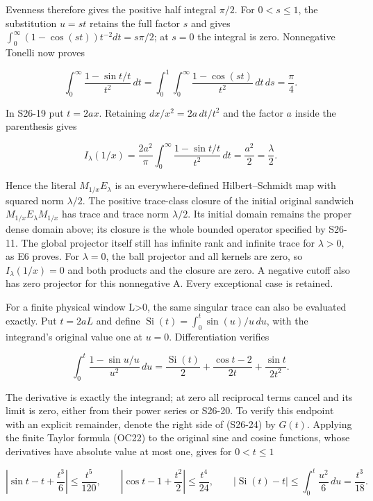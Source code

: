\documentclass[
  11pt,
]{article}
\begin{document}
Evenness therefore gives the positive half integral \(\pi/2\). For
\(0<s\le1\), the substitution \(u=st\) retains the full factor \(s\) and
gives \(\int_0^\infty(1-\cos(st))t^{-2}dt=s\pi/2\); at \(s=0\) the
integral is zero. Nonnegative Tonelli now proves

\[
\int_0^\infty\frac{1-\sin t/t}{t^2}\,dt
=\int_0^1\int_0^\infty\frac{1-\cos(st)}{t^2}\,dt\,ds
=\frac\pi4.
\tag{S26-22}
\]

In S26-19 put \(t=2ax\). Retaining \(dx/x^2=2a\,dt/t^2\) and the factor
\(a\) inside the parenthesis gives

\[
I_\lambda(1/x)
=\frac{2a^2}{\pi}\int_0^\infty
                   \frac{1-\sin t/t}{t^2}\,dt
=\frac{a^2}2=\frac\lambda2.
\tag{S26-23}
\]

Hence the literal \(M_{1/x}E_\lambda\) is an everywhere-defined
Hilbert--Schmidt map with squared norm \(\lambda/2\). The positive
trace-class closure of the initial original sandwich
\(M_{1/x}E_\lambda M_{1/x}\) has trace and trace norm \(\lambda/2\). Its
initial domain remains the proper dense domain above; its closure is the
whole bounded operator specified by S26-11. The global projector itself
still has infinite rank and infinite trace for \(\lambda>0\), as E6
proves. For \(\lambda=0\), the ball projector and all kernels are zero,
so \(I_\lambda(1/x)=0\) and both products and the closure are zero. A
negative cutoff also has zero projector for this nonnegative A. Every
exceptional case is retained.

For a finite physical window L\textgreater0, the same singular trace can
also be evaluated exactly. Put \(t=2aL\) and define
\(\operatorname{Si}(t)=\int_0^t\sin(u)/u\,du\), with the integrand's
original value one at \(u=0\). Differentiation verifies

\[
\int_0^t\frac{1-\sin u/u}{u^2}\,du
=\frac{\operatorname{Si}(t)}2
 +\frac{\cos t-2}{2t}+\frac{\sin t}{2t^2}.
\tag{S26-24}
\]

The derivative is exactly the integrand; at zero all reciprocal terms
cancel and its limit is zero, either from their power series or S26-20.
To verify this endpoint with an explicit remainder, denote the right
side of (S26-24) by \(G(t)\). Applying the finite Taylor formula (OC22)
to the original sine and cosine functions, whose derivatives have
absolute value at most one, gives for \(0<t\le1\)

\[
 \left|\sin t-t+\frac{t^3}{6}\right|\le\frac{t^5}{120},
 \qquad
 \left|\cos t-1+\frac{t^2}{2}\right|\le\frac{t^4}{24},
 \qquad
 |\operatorname{Si}(t)-t|\le\int_0^t\frac{u^2}{6}\,du
 =\frac{t^3}{18}.
\]
\end{document}
